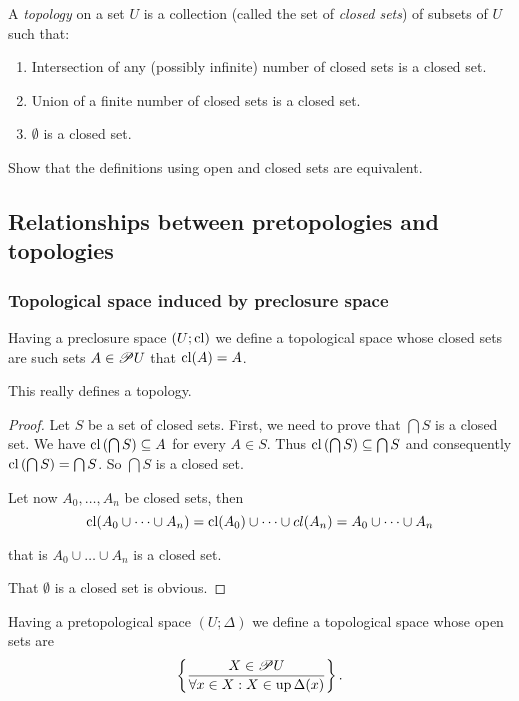 A \emph{topology} on a set $U$ is a collection (called the set of
\emph{closed sets}) of subsets of $U$ such that:
\begin{enumerate}
\item Intersection of any (possibly infinite) number of closed sets is a
closed set.
\item Union of a finite number of closed sets is a closed set.
\item $\emptyset$ is a closed set.\end{enumerate}
\begin{xca}
Show that the definitions using open and closed sets are equivalent.
\end{xca}

\subsection{Relationships between pretopologies and topologies}


\subsubsection{Topological space induced by preclosure space}

Having a preclosure
space $(U;\operatorname{cl})$ we define a topological space whose closed sets are
such sets $A\in\mathscr{P} U$ that $\operatorname{cl}(A)=A$.
\begin{prop}
This really defines a topology.\end{prop}
\begin{proof}
Let $S$ be a set of closed sets. First, we need to prove that $\bigcap S$
is a closed set. We have $\operatorname{cl}\left(\bigcap S\right)\subseteq A$ for
every $A\in S$. Thus $\operatorname{cl}\left(\bigcap S\right)\subseteq\bigcap S$
and consequently $\operatorname{cl}\left(\bigcap S\right)=\bigcap S$. So $\bigcap S$
is a closed set.

Let now $A_{0},\dots,A_{n}$ be closed sets, then
\[
\operatorname{cl}(A_{0}\cup\dots\cup A_{n})=\operatorname{cl}(A_{0})\cup\dots\cup cl(A_{n})=A_{0}\cup\dots\cup A_{n}
\]


that is $A_{0}\cup\dots\cup A_{n}$ is a closed set.

That $\emptyset$ is a closed set is obvious.
\end{proof}
Having a pretopological space $(U;\Delta)$ we define a topological
space whose open sets are
\[
\left\{ \frac{X\in\mathscr{P} U}{\forall x\in X:X\in\operatorname{up}\Delta(x)}\right\}.
\]

